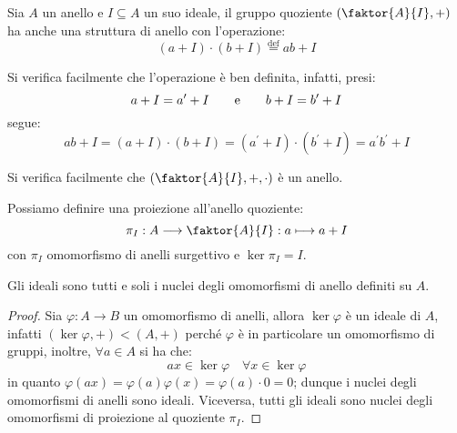 \documentclass[11pt]{scrartcl}
\begin{document}
\begin{definition}
    Sia $A$ un anello e $I \subseteq A$ un suo ideale, il gruppo quoziente $\left(\faktor{A}{I}, +\right)$ ha anche una struttura di anello con l'operazione:
        \[ (a + I) \cdot (b + I) \stackrel{\text{def}}{=} ab + I
            \]
\end{definition}

\begin{remark}
    Si verifica facilmente che l'operazione è ben definita, infatti, presi:
        \[ a + I = a^{\prime} + I \qquad \text e \qquad b + I = b^{\prime} + I
            \]
    segue:
        \[ ab + I = (a + I) \cdot (b + I) = (a^{\prime} + I) \cdot (b^{\prime} + I) = a^{\prime}b^{\prime} + I
            \]
\end{remark}

\begin{remark}
    Si verifica facilmente che $\left(\faktor{A}{I},+,\cdot\right)$ è un anello.
\end{remark}

\begin{remark}
    Possiamo definire una proiezione all'anello quoziente:
        \[ \pi_I : A \longrightarrow \faktor{A}{I} : a \longmapsto a + I
            \]
    con $\pi_I$ omomorfismo di anelli surgettivo e $\ker \pi_I = I$.
\end{remark}

\begin{proposition}
    Gli ideali sono tutti e soli i nuclei degli omomorfismi di anello definiti su $A$.
\end{proposition}

\begin{proof}
    Sia $\varphi : A \longrightarrow B$ un omomorfismo di anelli, allora $\ker \varphi$ è un ideale di $A$, infatti $(\ker \varphi, +) < (A,+)$ perché $\varphi$ 
    è in particolare un omomorfismo di gruppi, inoltre, $\forall a \in A$ si ha che:
        \[ ax \in \ker \varphi \quad \forall x \in \ker \varphi
            \]
    in quanto $\varphi(ax) = \varphi(a)\varphi(x) = \varphi(a) \cdot 0 = 0$; dunque i nuclei degli omomorfismi di anelli sono ideali. Viceversa, tutti gli ideali 
    sono nuclei degli omomorfismi di proiezione al quoziente $\pi_I$.
\end{proof}

\end{document}
